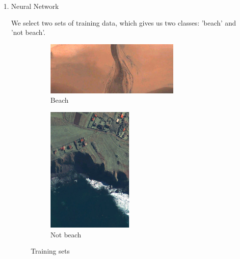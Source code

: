\begin{enumerate}
    \item Neural Network
    
    We select two sets of training data, which gives us two classes: 'beach' and 'not beach'. 
    \begin{figure}[!ht]
        \centering
        \begin{subfigure}{0.2\textwidth}
            \centering
            \includegraphics[width=\textwidth, angle=90]{Doc/Graphics/Part4/training_set_beach.png}
            \caption{Beach}
        \end{subfigure}
        \begin{subfigure}{0.4\textwidth}
            \centering
            \includegraphics[width=0.5\textwidth, angle=90]{Doc/Graphics/Part4/training_set_other.png}
            \caption{Not beach}
        \end{subfigure}
        \caption{Training sets}
    \end{figure}
    \FloatBarrier


\end{enumerate}
